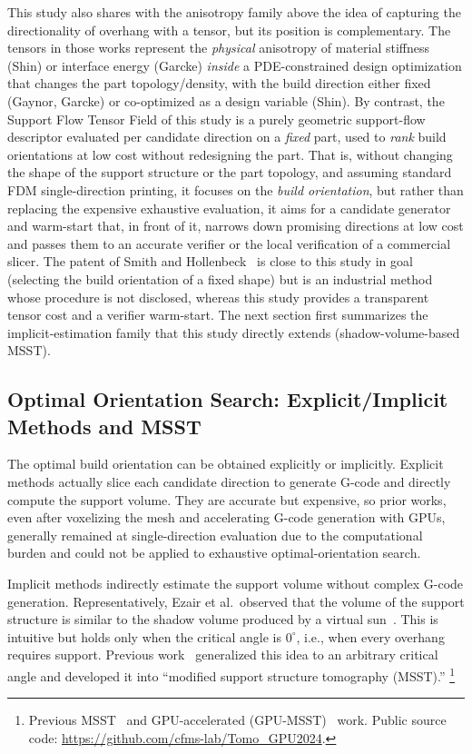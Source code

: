 \documentclass[11pt,a4paper]{article}
\begin{document}
This study also shares with the anisotropy family above the idea of capturing the directionality of overhang with a tensor, but its position is complementary.
The tensors in those works represent the \emph{physical} anisotropy of material stiffness (Shin) or interface energy (Garcke)
\emph{inside} a PDE-constrained design optimization that changes the part topology/density,
with the build direction either fixed (Gaynor, Garcke) or co-optimized as a design variable (Shin).
By contrast, the Support Flow Tensor Field of this study is a purely geometric support-flow descriptor evaluated per candidate direction on a \emph{fixed} part,
used to \emph{rank} build orientations at low cost without redesigning the part.
That is, without changing the shape of the support structure or the part topology, and assuming standard FDM single-direction printing,
it focuses on the \emph{build orientation}, but rather than replacing the expensive exhaustive evaluation, it aims for a candidate generator and warm-start
that, in front of it, narrows down promising directions at low cost and passes them to an accurate verifier or the local verification of a commercial slicer.
The patent of Smith and Hollenbeck~\cite{smith2025patent} is close to this study in goal (selecting the build orientation of a fixed shape)
but is an industrial method whose procedure is not disclosed, whereas this study provides a transparent tensor cost and a verifier warm-start.
The next section first summarizes the implicit-estimation family that this study directly extends (shadow-volume-based MSST).

\subsection{Optimal Orientation Search: Explicit/Implicit Methods and MSST}

The optimal build orientation can be obtained explicitly or implicitly.
Explicit methods actually slice each candidate direction to generate G-code and directly compute the support volume.
They are accurate but expensive, so prior works, even after voxelizing the mesh and accelerating G-code generation with GPUs,
generally remained at single-direction evaluation due to the computational burden and could not be applied to exhaustive optimal-orientation search.

Implicit methods indirectly estimate the support volume without complex G-code generation.
Representatively, Ezair et al.\ observed that the volume of the support structure is similar to the shadow volume produced by a virtual sun~\cite{ezair}.
This is intuitive but holds only when the critical angle is $0^\circ$, i.e., when every overhang requires support.
Previous work~\cite{msst} generalized this idea to an arbitrary critical angle
and developed it into ``modified support structure tomography (MSST).''%
\footnote{Previous MSST~\cite{msst} and GPU-accelerated (GPU-MSST)~\cite{gpumsst} work. Public source code:
\url{https://github.com/cfms-lab/Tomo_GPU2024}.}
\end{document}
